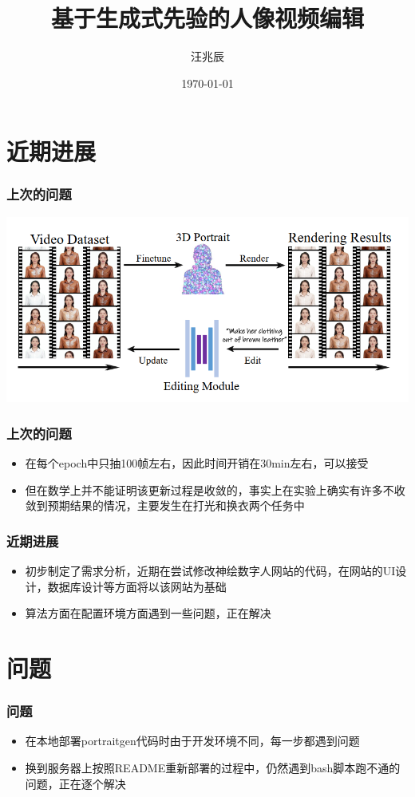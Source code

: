 \documentclass{beamer}
\title{基于生成式先验的人像视频编辑}
\author{汪兆辰}
\date{\ukdate\today}
\begin{document}
\begin{frame}
    \titlepage
\end{frame}

\section{近期进展}

\begin{frame}
    \frametitle{上次的问题}
    \includegraphics[width=\textwidth]{pic1.png}
\end{frame}

\begin{frame}
    \frametitle{上次的问题}
    \begin{itemize}
        \item 在每个epoch中只抽100帧左右，因此时间开销在30min左右，可以接受
        \item 但在数学上并不能证明该更新过程是收敛的，事实上在实验上确实有许多不收敛到预期结果的情况，主要发生在打光和换衣两个任务中
    \end{itemize}
\end{frame}

\begin{frame}
    \frametitle{近期进展}
    \begin{itemize}
        \item 初步制定了需求分析，近期在尝试修改神绘数字人网站的代码，在网站的UI设计，数据库设计等方面将以该网站为基础
        \item 算法方面在配置环境方面遇到一些问题，正在解决
    \end{itemize}
\end{frame}

\section{问题}

\begin{frame}
    \frametitle{问题}
    \begin{itemize}
        \item 在本地部署portraitgen代码时由于开发环境不同，每一步都遇到问题
        \item 换到服务器上按照README重新部署的过程中，仍然遇到bash脚本跑不通的问题，正在逐个解决
    \end{itemize}
\end{frame}
\end{document}

